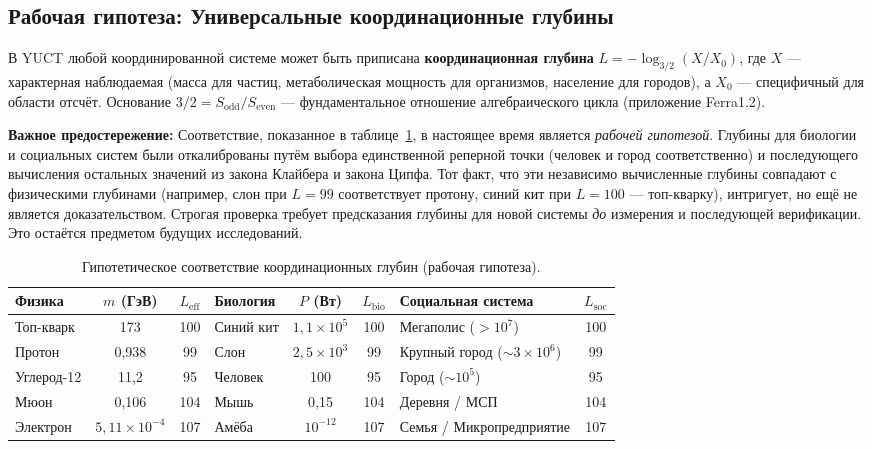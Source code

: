\documentclass[11pt]{article}
\theoremstyle{remark}
\begin{document}
	\subsection{Рабочая гипотеза: Универсальные координационные глубины}
	\label{sec:isomorphism}
	
	В YUCT любой координированной системе может быть приписана \textbf{координационная глубина} \(L = -\log_{3/2}(X/X_0)\), где \(X\) — характерная наблюдаемая (масса для частиц, метаболическая мощность для организмов, население для городов), а \(X_0\) — специфичный для области отсчёт. Основание \(3/2 = S_{\mathrm{odd}}/S_{\mathrm{even}}\) — фундаментальное отношение алгебраического цикла (приложение Ferra1.2).
	
	\textbf{Важное предостережение:} Соответствие, показанное в таблице~\ref{tab:universal_depths}, в настоящее время является \emph{рабочей гипотезой}. Глубины для биологии и социальных систем были откалиброваны путём выбора единственной реперной точки (человек и город соответственно) и последующего вычисления остальных значений из закона Клайбера и закона Ципфа. Тот факт, что эти независимо вычисленные глубины совпадают с физическими глубинами (например, слон при \(L=99\) соответствует протону, синий кит при \(L=100\) — топ-кварку), интригует, но ещё не является доказательством. Строгая проверка требует предсказания глубины для новой системы \emph{до} измерения и последующей верификации. Это остаётся предметом будущих исследований.
	
	\begin{table}[H]
		\centering
		\caption{Гипотетическое соответствие координационных глубин (рабочая гипотеза).}
		\label{tab:universal_depths}
		\footnotesize
		\begin{tabular}{l c c l c c l c}
			\toprule
			\textbf{Физика} & \(m\) (ГэВ) & \(L_{\mathrm{eff}}\) & \textbf{Биология} & \(P\) (Вт) & \(L_{\mathrm{bio}}\) & \textbf{Социальная система} & \(L_{\mathrm{soc}}\) \\
			\midrule
			Топ-кварк & 173 & 100 & Синий кит & \(1,1\times10^5\) & 100 & Мегаполис ($>10^7$) & 100 \\
			Протон & 0,938 & 99 & Слон & \(2,5\times10^3\) & 99 & Крупный город ($\sim 3\times10^6$) & 99 \\
			Углерод-12 & 11,2 & 95 & Человек & 100 & 95 & Город ($\sim 10^5$) & 95 \\
			Мюон & 0,106 & 104 & Мышь & 0,15 & 104 & Деревня / МСП & 104 \\
			Электрон & \(5,11\times10^{-4}\) & 107 & Амёба & \(10^{-12}\) & 107 & Семья / Микропредприятие & 107 \\
			\bottomrule
		\end{tabular}
	\end{table}
	
\end{document}
